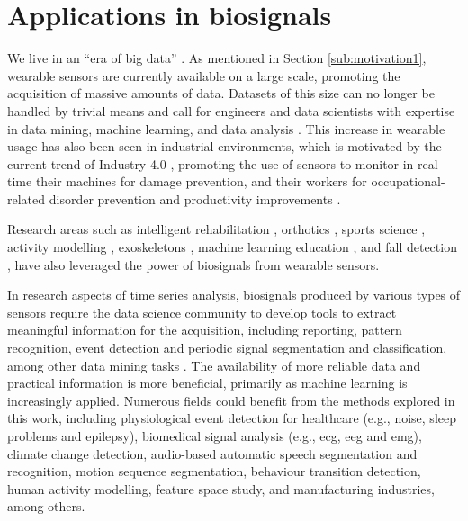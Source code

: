 \section{Applications in biosignals}

We live in an ``era of big data'' \cite{chen2014big}. As mentioned in Section \ref{sub:motivation1}, wearable sensors are currently available on a large scale, promoting the acquisition of massive amounts of data.
Datasets of this size can no longer be handled by trivial means and call for engineers and data scientists with expertise in data mining, machine learning, and data analysis \cite{weiner2017bremen}.
This increase in wearable usage has also been seen in industrial environments, which is motivated by the current trend of Industry 4.0 \cite{xu2018industry}, promoting the use of sensors to monitor in real-time their machines for damage prevention, and their workers for occupational-related disorder prevention and productivity improvements \cite{Varandas19, santos2019}.

Research areas such as intelligent rehabilitation \cite{liu19realtime, patel2012review, bonato2005advances, sung2005wearable, chen2015wearable, jakob2018robotic}, orthotics \cite{zhou22orthoses, menz2021objective, zhou21ankle, mangukiya2017electromyography}, sports science \cite{li20gait, liu22activityduration, mendes2016sensor, ji2018real, howard2016survey, mcnab2011iphone, howard2016wireless, yuji2005mems, espinosa2015inertial, ohgi2002microcomputer}, activity modelling \cite{liu2021thesis, chen2012sensor, chen2013ontology, liu2021motionunits}, exoskeletons \cite{wege2007electromyography, ganesan2015development}, machine learning education \cite{hartmann2022interactive}, and fall detection \cite{chen2006wearable, nyan2008wearable, xue2021hmm}, have also leveraged the power of biosignals from wearable sensors.

In research aspects of time series analysis, biosignals produced by various types of sensors require the data science community to develop tools to extract meaningful information for the acquisition, including reporting, pattern recognition, event detection and periodic signal segmentation and classification, among other data mining tasks \cite{rodrigues2017noise, david_thesis}. The availability of more reliable data and practical information is more beneficial, primarily as machine learning is increasingly applied. Numerous fields could benefit from the methods explored in this work, including physiological event detection for healthcare (e.g., noise, sleep problems and epilepsy), biomedical signal analysis (e.g., \gls{ecg}, \gls{eeg} and \gls{emg}), climate change detection, audio-based automatic speech segmentation and recognition, motion sequence segmentation, behaviour transition detection, human activity modelling, feature space study, and manufacturing industries, among others.

